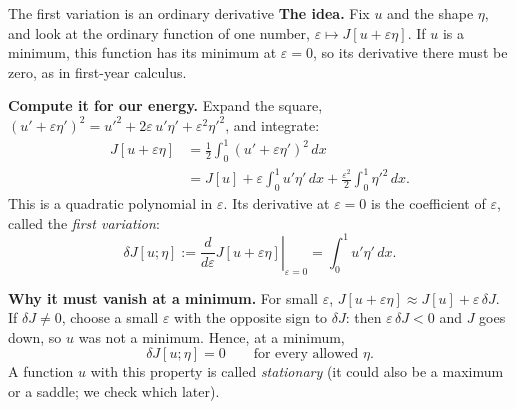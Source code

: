 \documentclass[11pt]{beamer}
\newcommand{\dd}{\,d}
\begin{document}
\begin{frame}[allowframebreaks=1.00]{The first variation is an ordinary derivative}
\small
\textbf{The idea.} Fix \(u\) and the shape \(\eta\), and look at the ordinary function of one number,
\(\varepsilon\mapsto J[u+\varepsilon\eta]\). If \(u\) is a minimum, this function has its minimum at \(\varepsilon=0\), so its
derivative there must be zero, as in first-year calculus.

\textbf{Compute it for our energy.} Expand the square,
\((u'+\varepsilon\eta')^2=u'^2+2\varepsilon\,u'\eta'+\varepsilon^2\eta'^2\), and integrate:
\begin{align*}
 J[u+\varepsilon\eta]
 &=\frac12\int_0^1(u'+\varepsilon\eta')^2\dd x\\
 &=J[u]+\varepsilon\int_0^1u'\eta'\dd x
       +\frac{\varepsilon^2}{2}\int_0^1\eta'^2\dd x.
\end{align*}
This is a quadratic polynomial in \(\varepsilon\). Its derivative at \(\varepsilon=0\) is the coefficient of
\(\varepsilon\), called the \emph{first variation}:
\begin{equation}
 \delta J[u;\eta]
 :=\left.\frac{d}{d\varepsilon}J[u+\varepsilon\eta]\right|_{\varepsilon=0}
 =\int_0^1u'\eta'\dd x.\label{eq:first-variation}
\end{equation}


\textbf{Why it must vanish at a minimum.} For small \(\varepsilon\),
\(J[u+\varepsilon\eta]\approx J[u]+\varepsilon\,\delta J\). If \(\delta J\ne0\), choose a small \(\varepsilon\) with the opposite sign
to \(\delta J\): then \(\varepsilon\,\delta J<0\) and \(J\) goes down, so \(u\) was not a minimum. Hence, at a minimum,
\[
 \delta J[u;\eta]=0\qquad\text{for every allowed }\eta .
\]
A function \(u\) with this property is called \emph{stationary} (it could also be a maximum or a saddle;
we check which later).
\end{frame}
\end{document}
